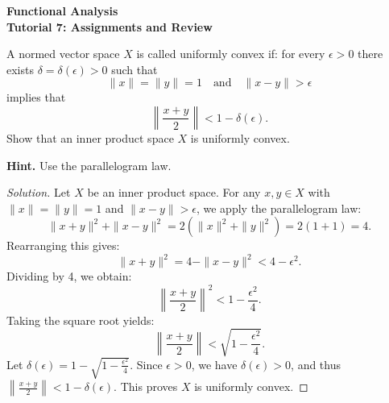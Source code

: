 \documentclass{article}
\begin{document}
\begin{center}
\Large\textbf{
Functional Analysis\\
\vspace{1em}
Tutorial 7: Assignments and Review
}
\date{}
\end{center}
\vspace{2em}
\begin{problem}
		A normed vector space $X$ is called uniformly convex if: for every $\epsilon > 0$ there exists $\delta = \delta(\epsilon) > 0$ such that 
		\[ \|x\| = \|y\| = 1 \quad \text{and} \quad \|x - y\| > \epsilon \]
		implies that 
		\[ \left\|\frac{x + y}{2}\right\| < 1 - \delta(\epsilon). \]
		Show that an inner product space $X$ is uniformly convex. 
		
		\noindent \textbf{Hint.} Use the parallelogram law.
	\end{problem}
    \begin{proof}[Solution]
        Let $X$ be an inner product space. For any $x, y \in X$ with $\|x\| = \|y\| = 1$ and $\|x - y\| > \epsilon$, we apply the parallelogram law:
        \[ \|x + y\|^2 + \|x - y\|^2 = 2(\|x\|^2 + \|y\|^2) = 2(1 + 1) = 4. \]
        Rearranging this gives:
        \[ \|x + y\|^2 = 4 - \|x - y\|^2 < 4 - \epsilon^2. \]
        Dividing by 4, we obtain:
        \[ \left\|\frac{x + y}{2}\right\|^2 < 1 - \frac{\epsilon^2}{4}. \]
        Taking the square root yields:
        \[ \left\|\frac{x + y}{2}\right\| < \sqrt{1 - \frac{\epsilon^2}{4}}. \]
        Let $\delta(\epsilon) = 1 - \sqrt{1 - \frac{\epsilon^2}{4}}$. Since $\epsilon > 0$, we have $\delta(\epsilon) > 0$, and thus $\left\|\frac{x + y}{2}\right\| < 1 - \delta(\epsilon)$. This proves $X$ is uniformly convex.
    \end{proof}
\end{document}
